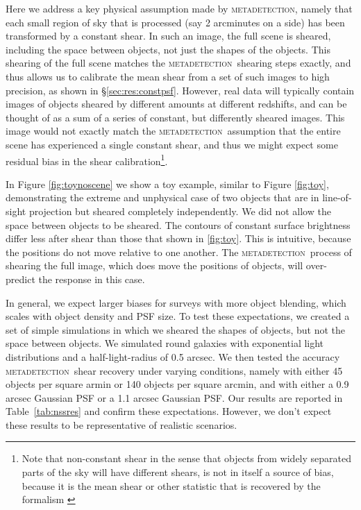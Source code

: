 \documentclass[iop, appendixfloats, numberedappendix, apj]{emulateapj}
\newcommand{\mdet}{\textsc{metadetection}}
\begin{document}
Here we address a key physical assumption made by \mdet, namely that each small
region of sky that is processed (say 2 arcminutes on a side) has been
transformed by a constant shear.  In such an image, the full scene is sheared,
including the space between objects, not just the shapes of the objects. This
shearing of the full scene matches the \mdet\ shearing steps exactly, and thus
allows us to calibrate the mean shear from a set of such images to high
precision, as shown in \S \ref{sec:res:constpsf}.  However, real data will
typically contain images of objects sheared by different amounts at different
redshifts, and can be thought of as a sum of a series of constant, but
differently sheared images.  This image would not exactly match the \mdet\
assumption that the entire scene has experienced a single constant shear, and
thus we might expect some residual bias in the shear calibration\footnote{Note
that non-constant shear in the sense that objects from widely separated parts
of the sky will have different shears, is not in itself a source of bias,
because it is the mean shear or other statistic that is recovered by the
formalism \citep{SheldonMcal2017}}.

In Figure \ref{fig:toynoscene} we show a toy example, similar to Figure
\ref{fig:toy}, demonstrating the extreme and unphysical case of two objects
that are in line-of-sight projection but sheared completely independently.  We
did not allow the space between objects to be sheared. The contours of constant
surface brightness differ less after shear than those that shown in
\ref{fig:toy}.  This is intuitive, because the positions do not move relative
to one another.  The \mdet\ process of shearing the full image, which does move
the positions of objects, will over-predict the response in this case.

In general, we expect larger biases for surveys with more object blending,
which scales with object density and PSF size.  To test these expectations, we
created a set of simple simulations in which we sheared the shapes of objects,
but not the space between objects.  We simulated round galaxies with
exponential light distributions and a half-light-radius of 0.5 arcsec. We then
tested the accuracy \mdet\ shear recovery under varying conditions, namely with
either 45 objects per square armin or 140 objects per square arcmin, and with
either a 0.9 arcsec Gaussian PSF or a 1.1 arcsec Gaussian PSF. Our results are
reported in Table~\ref{tab:nssres} and confirm these expectations. However, we
don't expect these results to be representative of realistic scenarios.
\end{document}
